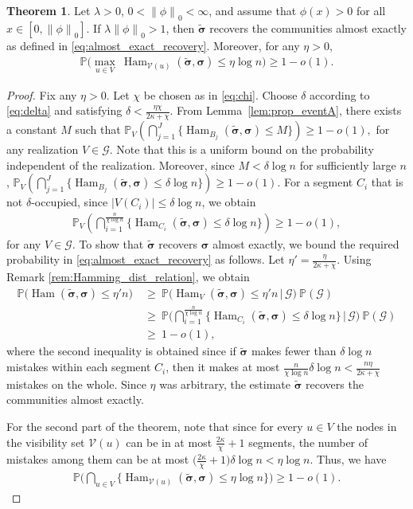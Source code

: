 \documentclass[letterpaper,11pt]{article}
\newtheorem{thm}{Theorem}[section]
\theoremstyle{definition}
\def\P{\mathbb{P}}
\newcommand{\bsigma}{\bm{\sigma}}
\newcommand{\tbsigma}{\tilde{\bsigma}}
\def\cG{\mathcal{G}}
\def\cV{\mathcal{V}}
\def\wge{ \ \ge \ }
\newcommand{\zeronorm}[1]{{\lVert#1\rVert}_0}
\numberwithin{equation}{section}
\newcommand{\ka}{\kappa}
\newcommand{\la}{\lambda}
\newcommand{\Ham}{\operatorname{Ham}}
\newtheorem{thm}{Theorem}[section]
\theoremstyle{definition}
\def\P{\mathbb{P}}
\newcommand{\bsigma}{\bm{\sigma}}
\newcommand{\tbsigma}{\tilde{\bsigma}}
\def\cG{\mathcal{G}}
\def\cV{\mathcal{V}}
\def\wge{ \ \ge \ }
\newcommand{\zeronorm}[1]{{\lVert#1\rVert}_0}
\numberwithin{equation}{section}
\newcommand{\ka}{\kappa}
\newcommand{\la}{\lambda}
\newcommand{\Ham}{\operatorname{Ham}}
\theoremstyle{thmstyletwo}%
\begin{document}
\begin{thm}
\label{thm:almost_exact}
Let $\la>0$, $0 < \zeronorm{\phi} < \infty$, and assume that $\phi(x)>0$ for all $x\in[0,\zeronorm{\phi}]$. If $\la \zeronorm{\phi}>1$, then $\tbsigma$ recovers the communities almost exactly as defined in \eqref{eq:almost_exact_recovery}. Moreover, for any $\eta >0$,
\begin{align*}
\P\Big(\max_{u\in V} \  \Ham_{\cV(u)}(\tbsigma,\bsigma) \le \eta \log n \Big) 
\ge 1-o(1).
\end{align*} 
\end{thm}
\begin{proof}
Fix any $\eta >0$. Let $\chi$ be chosen as in \eqref{eq:chi}.
Choose $\delta$ according to \eqref{eq:delta} and satisfying $\delta < \frac{\eta \chi}{2\ka+\chi}$.
From Lemma~\ref{lem:prop_eventA}, there exists a constant $M$ such that
$
\P_V\left(\bigcap_{j=1}^{J} \{\Ham_{B_j}(\tbsigma,\bsigma) \le M\}\right) \ge 1-o(1),
$
for any realization $V\in \cG$. Note that this is a uniform bound on the probability independent of the realization. Moreover, since $M< \delta \log n$ for sufficiently large $n$, 
$\P_V\left(\bigcap_{j=1}^{J} \{\Ham_{B_j}(\tbsigma,\bsigma) \le \delta \log n\}\right) \ge 1-o(1).$
For a segment $C_i$ that is not $\delta$-occupied, since $|V(C_i)| \le \delta\log n$, we obtain
\begin{align*}
\P_V\left(\bigcap_{i=1}^{\frac{n}{\chi\log n}} \{\Ham_{C_i}(\tbsigma,\bsigma) \le \delta \log n\}\right) 
\ge 1-o(1),
\end{align*}
for any $V\in \cG$. To show that $\tbsigma$ recovers $\bsigma$ almost exactly, we bound the required probability in \eqref{eq:almost_exact_recovery} as follows. Let $\eta' = \frac{ \eta }{2 \ka+\chi}$. Using Remark \ref{rem:Hamming_dist_relation}, we obtain
\begin{align*}
\P\big(\Ham(\tbsigma,\bsigma) \le \eta'n\big)  
&\wge \P\big(\Ham_V(\tbsigma,\bsigma) \le \eta'n \,\big| \,\cG\big)\ \P(\cG)\\
&\wge \P\bigg(\bigcap_{i=1}^{\frac{n}{\chi\log n}} \{\Ham_{C_i}(\tbsigma,\bsigma) \le \delta \log n\}\,\bigg| \,\cG\bigg) \ \P(\cG)\\
&\wge 1-o(1),
\end{align*}
where the second inequality is obtained since if $\tilde{\bsigma}$ makes fewer than $\delta \log n $ mistakes within each segment $C_i$, then it makes at most $\frac{n}{\chi \log n} \delta \log n  < \frac{n \eta}{2 \ka+\chi}$ mistakes on the whole. Since $\eta$ was arbitrary, the estimate $\tilde{\bsigma}$ recovers the communities almost exactly. 

For the second part of the theorem, note that since for every $u\in V$ the nodes in the visibility set $\cV(u)$ can be in at most $\frac{2 \ka}{\chi}+1$ segments, the number of mistakes among them can be at most $\Big(\frac{2 \ka}{\chi}+1\Big) \delta \log n < \eta \log n$. Thus, we have
\begin{align*}
\P\bigg(\bigcap_{u\in V}\Big\{ \Ham_{\cV(u)}(\tbsigma,\bsigma)  \le \eta \log n \Big\}\bigg) \ge 1-o(1).
\end{align*} 
\end{proof}
\end{document}
